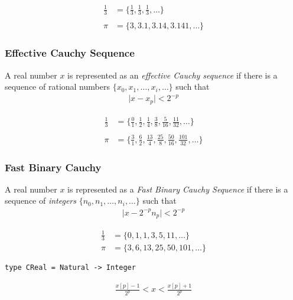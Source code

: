 \documentclass[11pt,aspectratio=169]{beamer}
\begin{document}
\begin{frame}
\begin{align*}
\frac{1}{3} &= \{\frac{1}{3}, \frac{1}{3}, \frac{1}{3}, \dots\} \\
~\\
\pi &= \{3, 3.1, 3.14, 3.141, \dots\}
\end{align*}
\end{frame}

\begin{frame}
\frametitle{Effective Cauchy Sequence}
\begin{definition}
A real number $x$ is represented as an \emph{effective Cauchy sequence} if
there is a sequence of rational numbers $\{x_0, x_1, \dots, x_i,
\dots\}$ such that
\begin{align*}
\vert x - x_p \vert < 2^{-p}
\end{align*}
\end{definition}
\begin{align*}
\frac{1}{3} &= \{\frac{0}{1}, \frac{1}{2}, \frac{1}{4}, \frac{3}{8}, \frac{5}{16}, \frac{11}{32}, \dots\}\\
~\\
\pi &= \{\frac{3}{1}, \frac{6}{2}, \frac{13}{4}, \frac{25}{8}, \frac{50}{16}, \frac{101}{32}, \dots\}
\end{align*}
\end{frame}

\begin{frame}[fragile]
\frametitle{Fast Binary Cauchy}
\begin{definition}
A real number $x$ is represented as a \emph{Fast Binary Cauchy Sequence} if
there is a sequence of \emph{integers} $\{n_0, n_1, \dots, n_i, \dots\}$ such that
\begin{align*}
\vert x - 2^{-p}n_p \vert < 2^{-p}
\end{align*}
\end{definition}
\begin{align*}
\frac{1}{3} &= \{0, 1, 1, 3, 5, 11, \dots \} \\
\pi &= \{3, 6, 13, 25, 50, 101, \dots \}
\end{align*}
\end{frame}

\begin{frame}[fragile]
\begin{verbatim}
type CReal = Natural -> Integer
\end{verbatim}
\pause
\begin{align*}
\frac{x[p] - 1}{2^p} < x < \frac{x[p] + 1}{2^p}
\end{align*}
\end{frame}
\end{document}
